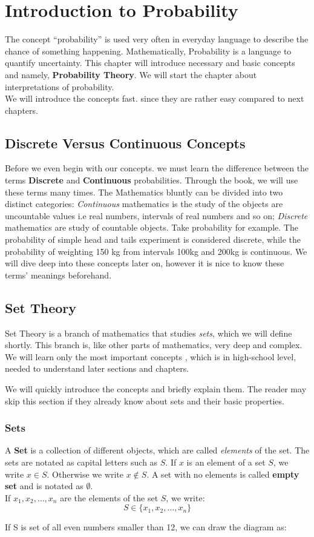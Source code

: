 \chapter{Introduction to Probability}
The concept ``probability'' is used very often in everyday language to describe the chance of something happening. Mathematically, Probability is a language to quantify uncertainty. 
This chapter will introduce necessary and basic concepts and namely, \textbf{Probability Theory}. We will start the chapter about interpretations of probability. \\
We will introduce the concepts fast. since they are rather easy compared to next chapters.
\section*{Discrete Versus Continuous Concepts}
Before we even begin with our concepts. we must learn the difference between the terms \textbf{Discrete} and \textbf{Continuous} probabilities. Through the book, we will use these terms many times.
The Mathematics bluntly can be divided into two distinct categories: \textit{Continuous} mathematics is the study of the objects are uncountable values i.e real numbers, intervals of real numbers and so on; \textit{Discrete} mathematics are study of countable objects.
Take probability for example. The probability of simple head and tails experiment is considered discrete, while the probability of weighting 150 kg from intervals 100kg and 200kg is continuous. We will dive deep into these concepts later on, however it is nice to know these terms' meanings beforehand.

\section{Set Theory}
Set Theory is a branch of mathematics that studies \textit{sets}, which we will define shortly. This branch is, like other parts of mathematics, very deep and complex. We will learn only the most important concepts , which is in high-school level, needed to understand later sections and chapters.
\par
We will quickly introduce the concepts and briefly explain them. The reader may skip this section if they already know about sets and their basic properties.

\subsection*{Sets}
A \textbf{Set} is a collection of different objects, which are called \textit{elements} of the set. The sets are notated as capital letters such as $S$.
If $x$ is an element of a set $S$, we write $x \in S$. Otherwise we write $ x \not\in S$. A set with no elements is called \textbf{empty set} and is notated as $\emptyset$. \\
If $x_1,x_2, \ldots,x_n$ are the elements of the set $S$, we write:
\[ S \in \{x_1,x_2, \ldots,x_n\} \]
\par
If S is set of all even numbers smaller than 12, we can draw the diagram as:



